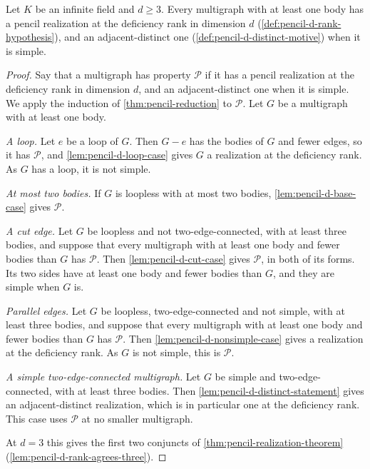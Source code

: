 \begin{theorem}
  \label{thm:pencil-d-realization-theorem}
  \leanok
  Let $K$ be an infinite field and $d \ge 3$. Every multigraph with at
  least one body has a pencil realization at the deficiency rank in
  dimension $d$ (\cref{def:pencil-d-rank-hypothesis}), and an
  adjacent-distinct one (\cref{def:pencil-d-distinct-motive}) when it is
  simple.
\end{theorem}
\begin{proof}
  \leanok
  Say that a multigraph has property $\mathcal P$ if it has a pencil
  realization at the deficiency rank in dimension $d$, and an
  adjacent-distinct one when it is simple. We apply the induction of
  \cref{thm:pencil-reduction} to $\mathcal P$. Let $G$ be a multigraph with at least one body.

  \emph{A loop.} Let $e$ be a loop of $G$. Then $G - e$ has the bodies of
  $G$ and fewer edges, so it has $\mathcal P$, and
  \cref{lem:pencil-d-loop-case} gives $G$ a realization at the
  deficiency rank. As $G$ has a loop, it is not simple.

  \emph{At most two bodies.} If $G$ is loopless with at most two bodies,
  \cref{lem:pencil-d-base-case} gives $\mathcal P$.

  \emph{A cut edge.} Let $G$ be loopless and not two-edge-connected, with
  at least three bodies, and suppose that every multigraph with at least
  one body and fewer bodies than $G$ has $\mathcal P$. Then
  \cref{lem:pencil-d-cut-case} gives $\mathcal P$, in both of its forms.
  Its two sides have at least one body and fewer bodies than $G$, and
  they are simple when $G$ is.

  \emph{Parallel edges.} Let $G$ be loopless, two-edge-connected and not
  simple, with at least three bodies, and suppose that every multigraph
  with at least one body and fewer bodies than $G$ has $\mathcal P$. Then
  \cref{lem:pencil-d-nonsimple-case} gives a realization at the
  deficiency rank. As $G$ is not simple, this is $\mathcal P$.

  \emph{A simple two-edge-connected multigraph.} Let $G$ be simple and
  two-edge-connected, with at least three bodies. Then
  \cref{lem:pencil-d-distinct-statement} gives an adjacent-distinct
  realization, which is in particular one at the deficiency rank. This
  case uses $\mathcal P$ at no smaller multigraph.

  At $d = 3$ this gives the first two conjuncts of
  \cref{thm:pencil-realization-theorem}
  (\cref{lem:pencil-d-rank-agrees-three}).
\end{proof}


